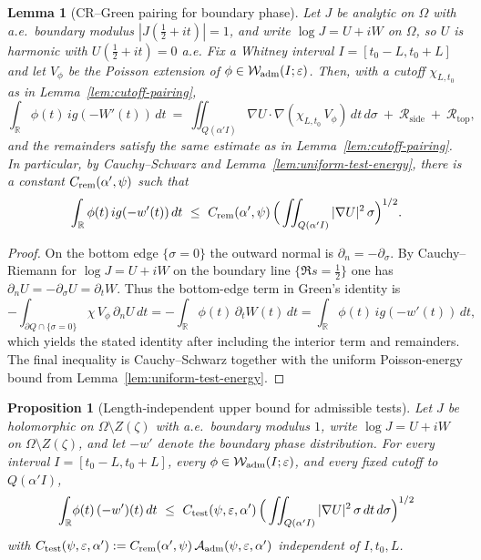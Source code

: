 \documentclass[11pt]{amsart}
\newtheorem{proposition}[theorem]{Proposition}
\newtheorem{lemma}[theorem]{Lemma}
\theoremstyle{definition}
\theoremstyle{remark}
\newcommand{\R}{\mathbb{R}}
\begin{document}
\begin{lemma}[CR--Green pairing for boundary phase]\label{lem:CR-green-phase}
Let \(J\) be analytic on \(\Omega\) with a.e.\ boundary modulus \(|J(\tfrac12+it)|=1\), and write \(\log J=U+iW\) on \(\Omega\), so \(U\) is harmonic with \(U(\tfrac12+it)=0\) a.e.
Fix a Whitney interval \(I=[t_0-L,t_0+L]\) and let \(V_\phi\) be the Poisson extension of \(\phi\in\mathcal W_{\rm adm}(I;\varepsilon)\).
Then, with a cutoff \(\chi_{L,t_0}\) as in Lemma~\ref{lem:cutoff-pairing},
\[
  \int_{\R} \phi(t)\,ig(-W'(t))\,dt
  \ =\ \iint_{Q(\alpha'I)} \nabla U\cdot \nabla(\chi_{L,t_0}\,V_\phi)\,dt\,d\sigma\ +\ \mathcal R_{\mathrm{side}}\ +\ \mathcal R_{\mathrm{top}},
\]
and the remainders satisfy the same estimate as in Lemma~\ref{lem:cutoff-pairing}.
In particular, by Cauchy--Schwarz and Lemma~\ref{lem:uniform-test-energy}, there is a constant \(C_{\rm rem}(\alpha',\psi)\) such that
\[
  \int_{\R} \phi(t)\,ig(-w'(t))\,dt\ \le\ C_{\rm rem}(\alpha',\psi)\,\Big(\iint_{Q(\alpha'I)} |\nabla U|^2\,\sigma\Big)^{1/2}.
\]
\end{lemma}
\begin{proof}
On the bottom edge \(\{\sigma=0\}\) the outward normal is \(\partial_n=-\partial_\sigma\).
By Cauchy--Riemann for \(\log J=U+iW\) on the boundary line \(\{\Re s=\tfrac12\}\) one has \(\partial_n U=-\partial_\sigma U=\partial_t W\).
Thus the bottom-edge term in Green's identity is
\[
  -\int_{\partial Q\cap\{\sigma=0\}} \chi\,V_\phi\,\partial_n U\,dt
  = -\int_{\R} \phi(t)\,\partial_t W(t)\,dt
  = \int_{\R} \phi(t)\,ig(-w'(t))\,dt,
\]
which yields the stated identity after including the interior term and remainders.
The final inequality is Cauchy--Schwarz together with the uniform Poisson-energy bound from Lemma~\ref{lem:uniform-test-energy}.
\end{proof}
\begin{proposition}[Length‑independent upper bound for admissible tests]\label{prop:length-free}
Let \(J\) be holomorphic on \(\Omega\setminus Z(\zeta)\) with a.e.\ boundary modulus \(1\), write \(\log J=U+iW\) on \(\Omega\setminus Z(\zeta)\), and let \(-w'\) denote the boundary phase distribution.
For every interval \(I=[t_0-L,t_0+L]\), every \(\phi\in\mathcal W_{\rm adm}(I;\varepsilon)\), and every fixed cutoff to \(Q(\alpha' I)\),
\begin{equation}\label{eq:CRG-upper-adm}
\int_{\mathbb R}\!\phi(t)\,(-w')(t)\,dt\ \le\ C_{\rm test}(\psi,\varepsilon,\alpha')\,\Big(\iint_{Q(\alpha' I)}|\nabla U|^2\,\sigma\,dt\,d\sigma\Big)^{1/2}
\end{equation}
with \(C_{\rm test}(\psi,\varepsilon,\alpha'):=C_{\rm rem}(\alpha',\psi)\,\mathcal A_{\rm adm}(\psi,\varepsilon,\alpha')\) independent of \(I,t_0,L\).
\end{proposition}
\end{document}
